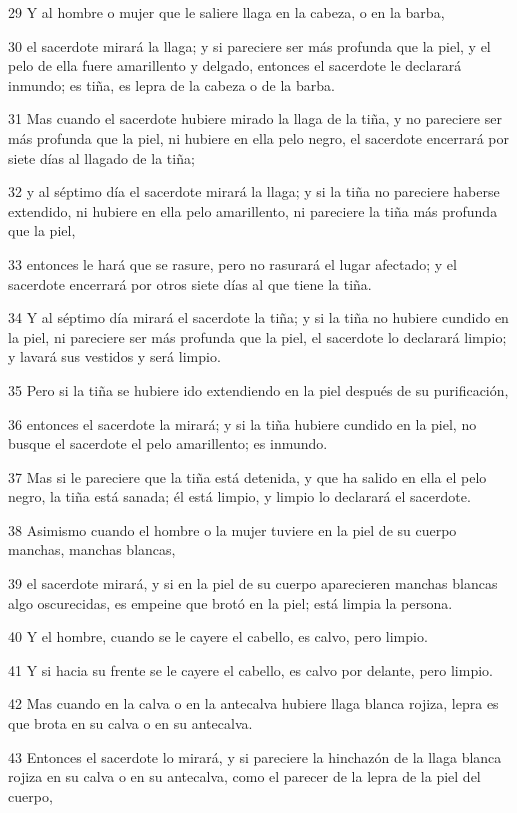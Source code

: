 \par 29 Y al hombre o mujer que le saliere llaga en la cabeza, o en la barba,
\par 30 el sacerdote mirará la llaga; y si pareciere ser más profunda que la piel, y el pelo de ella fuere amarillento y delgado, entonces el sacerdote le declarará inmundo; es tiña, es lepra de la cabeza o de la barba.
\par 31 Mas cuando el sacerdote hubiere mirado la llaga de la tiña, y no pareciere ser más profunda que la piel, ni hubiere en ella pelo negro, el sacerdote encerrará por siete días al llagado de la tiña;
\par 32 y al séptimo día el sacerdote mirará la llaga; y si la tiña no pareciere haberse extendido, ni hubiere en ella pelo amarillento, ni pareciere la tiña más profunda que la piel,
\par 33 entonces le hará que se rasure, pero no rasurará el lugar afectado; y el sacerdote encerrará por otros siete días al que tiene la tiña.
\par 34 Y al séptimo día mirará el sacerdote la tiña; y si la tiña no hubiere cundido en la piel, ni pareciere ser más profunda que la piel, el sacerdote lo declarará limpio; y lavará sus vestidos y será limpio.
\par 35 Pero si la tiña se hubiere ido extendiendo en la piel después de su purificación,
\par 36 entonces el sacerdote la mirará; y si la tiña hubiere cundido en la piel, no busque el sacerdote el pelo amarillento; es inmundo.
\par 37 Mas si le pareciere que la tiña está detenida, y que ha salido en ella el pelo negro, la tiña está sanada; él está limpio, y limpio lo declarará el sacerdote.
\par 38 Asimismo cuando el hombre o la mujer tuviere en la piel de su cuerpo manchas, manchas blancas,
\par 39 el sacerdote mirará, y si en la piel de su cuerpo aparecieren manchas blancas algo oscurecidas, es empeine que brotó en la piel; está limpia la persona.
\par 40 Y el hombre, cuando se le cayere el cabello, es calvo, pero limpio.
\par 41 Y si hacia su frente se le cayere el cabello, es calvo por delante, pero limpio.
\par 42 Mas cuando en la calva o en la antecalva hubiere llaga blanca rojiza, lepra es que brota en su calva o en su antecalva.
\par 43 Entonces el sacerdote lo mirará, y si pareciere la hinchazón de la llaga blanca rojiza en su calva o en su antecalva, como el parecer de la lepra de la piel del cuerpo,

